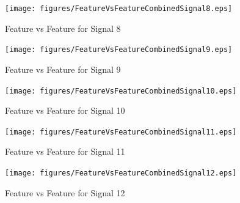 \documentclass[]{article}
\begin{document}
\begin{appendices}
\begin{figure}[H]
    \centering
    \texttt{[image: figures/FeatureVsFeatureCombinedSignal8.eps]}
    \caption{Feature vs Feature for Signal 8}
\end{figure}

\begin{figure}[H]
    \centering
    \texttt{[image: figures/FeatureVsFeatureCombinedSignal9.eps]}
    \caption{Feature vs Feature for Signal 9}
\end{figure}

\begin{figure}[H]
    \centering
    \texttt{[image: figures/FeatureVsFeatureCombinedSignal10.eps]}
    \caption{Feature vs Feature for Signal 10}
\end{figure}

\begin{figure}[H]
    \centering
    \texttt{[image: figures/FeatureVsFeatureCombinedSignal11.eps]}
    \caption{Feature vs Feature for Signal 11}
\end{figure}

\begin{figure}[H]
    \centering
    \texttt{[image: figures/FeatureVsFeatureCombinedSignal12.eps]}
    \caption{Feature vs Feature for Signal 12}
\end{figure}

\end{appendices}
\end{document}
